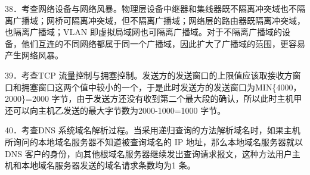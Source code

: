 \documentclass[UTF8,11pt]{ctexart}
\begin{document}
38．考查网络设备与网络风暴。物理层设备中继器和集线器既不隔离冲突域也不隔离广播域；网桥可隔离冲突域，但不隔离广播域；网络层的路由器既隔离冲突域，也隔离广播域；VLAN 即虚拟局域网也可隔离广播域。对于不隔离广播域的设备，他们互连的不同网络都属于同一个广播域，因此扩大了广播域的范围，更容易产生网络风暴。


39．考查TCP 流量控制与拥塞控制。发送方的发送窗口的上限值应该取接收方窗口和拥塞窗口这两个值中较小的一个，于是此时发送方的发送窗口为MIN\{4000，2000\}=2000 字节，由于发送方还没有收到第二个最大段的确认，所以此时主机甲还可以向主机乙发送的最大字节数为2000-1000=1000 字节。


40．考查DNS 系统域名解析过程。当采用递归查询的方法解析域名时，如果主机所询问的本地域名服务器不知道被查询域名的 IP 地址，那么本地域名服务器就以 DNS 客户的身份，向其他根域名服务器继续发出查询请求报文，这种方法用户主机和本地域名服务器发送的域名请求条数均为1 条。
\end{document}
